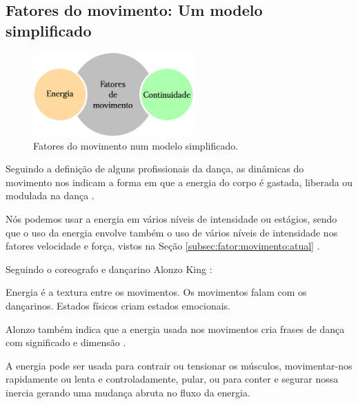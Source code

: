 \subsection{Fatores do movimento: Um modelo simplificado}

\begin{figure}
\centering

\includegraphics[width=0.55\textwidth]{chapters/cap-musicalidade/fatores-de-movimento.eps}
\caption{Fatores do movimento num modelo simplificado.}
\label{fig:fatores:moviemnto:simplificada}
\end{figure}
Seguindo a definição de alguns profissionais da dança, 
as dinâmicas do movimento nos indicam a forma em que a energia do corpo
é gastada, liberada ou modulada na dança \cite[pp. 126, 131, 136]{mccutchen2006teaching}.

Nós podemos usar a energia em vários níveis de intensidade ou estágios,
sendo que o uso da energia envolve também o uso de vários níveis de intensidade 
nos fatores velocidade e força, vistos na Seção  \ref{subsec:fator:movimento:atual} \cite[pp. 99]{sofras2019dance}.

Seguindo o coreografo e dançarino Alonzo King \cite[pp. 99, 100]{sofras2019dance}:
\begin{citando}%
Energia é a textura entre os movimentos.
Os movimentos falam com os dançarinos.
Estados físicos criam estados emocionais.
\end{citando}
Alonzo também indica que a energia usada nos movimentos cria frases de dança com significado e dimensão \cite[pp. 99]{sofras2019dance}.

A energia pode ser usada para contrair ou tensionar os músculos,
movimentar-nos rapidamente ou lenta e controladamente, pular, 
ou para conter e segurar nossa inercia gerando uma mudança abruta no fluxo da energia.

